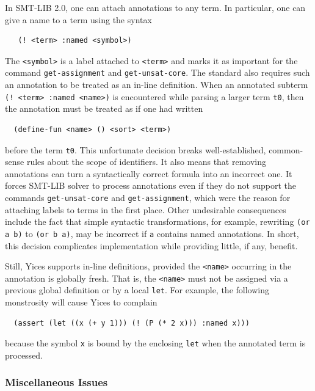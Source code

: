 \documentclass[11pt,twoside,fleqn,openright,titlepage]{cslreport}
\begin{document}
In SMT-LIB 2.0, one can attach annotations to any term. In particular,
one can give a name to a term using the syntax
\begin{small}
\begin{verbatim}
   (! <term> :named <symbol>)
\end{verbatim}
\end{small}
The \texttt{<symbol>} is a label attached to \texttt{<term>} and marks
it as important for the command \texttt{get-assignment} and
\texttt{get-unsat-core}.  The standard also requires such an
annotation to be treated as an in-line definition. When an annotated
subterm \texttt{(! <term> :named <name>)} is encountered while parsing
a larger term \texttt{t0}, then the annotation must be treated as if
one had written
\begin{small}
\begin{verbatim}
  (define-fun <name> () <sort> <term>)
\end{verbatim}
\end{small}
before the term \texttt{t0}. This unfortunate decision breaks
well-established, common-sense rules about the scope of
identifiers. It also means that removing annotations can turn a
syntactically correct formula into an incorrect one. It forces SMT-LIB
solver to process annotations even if they do not support the commands
\texttt{get-unsat-core} and \texttt{get-assignment}, which were the
reason for attaching labels to terms in the first place.  Other
undesirable consequences include the fact that simple syntactic
transformations, for example, rewriting \texttt{(or a b)} to
\texttt{(or b a)}, may be incorrect if \texttt{a} contains named
annotations.  In short, this decision complicates implementation
while providing little, if any, benefit.

\medskip\noindent Still, Yices supports in-line definitions, provided
the \texttt{<name>} occurring in the annotation is globally fresh. That
is, the \texttt{<name>} must not be assigned via a previous global
definition or by a local \texttt{let}.  For example, the following
monstrosity will cause Yices to complain
\begin{small}
\begin{verbatim}
  (assert (let ((x (+ y 1))) (! (P (* 2 x))) :named x)))
\end{verbatim}
\end{small}
because the symbol \texttt{x} is bound by the enclosing \texttt{let}
when the annotated term is processed.


\subsubsection*{Miscellaneous Issues}
\end{document}
